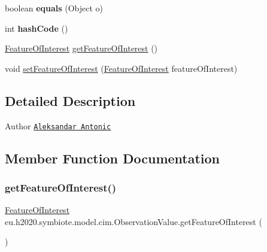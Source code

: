\begin{DoxyCompactItemize}
\mbox{\label{classeu_1_1h2020_1_1symbiote_1_1model_1_1cim_1_1ObservationValue_a40c2195ac546538a45937f7cd5fcb830}} 
boolean {\bfseries equals} (Object o)
\item 
\mbox{\label{classeu_1_1h2020_1_1symbiote_1_1model_1_1cim_1_1ObservationValue_a6a7b8635567252f78076b717274e21b7}} 
int {\bfseries hash\+Code} ()
\item 
\hyperlink{classeu_1_1h2020_1_1symbiote_1_1model_1_1cim_1_1FeatureOfInterest}{Feature\+Of\+Interest} \hyperlink{classeu_1_1h2020_1_1symbiote_1_1model_1_1cim_1_1ObservationValue_ad2672443ca00ec6220cd3a952751a44d}{get\+Feature\+Of\+Interest} ()
\item 
void \hyperlink{classeu_1_1h2020_1_1symbiote_1_1model_1_1cim_1_1ObservationValue_a957aeb12313f1e520735a398fe9cdfd0}{set\+Feature\+Of\+Interest} (\hyperlink{classeu_1_1h2020_1_1symbiote_1_1model_1_1cim_1_1FeatureOfInterest}{Feature\+Of\+Interest} feature\+Of\+Interest)
\end{DoxyCompactItemize}


\subsection{Detailed Description}
\begin{DoxyAuthor}{Author}
\href{mailto:aleksandar.antonic@fer.hr}{\tt Aleksandar Antonic} 
\end{DoxyAuthor}


\subsection{Member Function Documentation}
\mbox{\label{classeu_1_1h2020_1_1symbiote_1_1model_1_1cim_1_1ObservationValue_ad2672443ca00ec6220cd3a952751a44d}} 
\subsubsection{\texorpdfstring{get\+Feature\+Of\+Interest()}{getFeatureOfInterest()}}
{\footnotesize\ttfamily \hyperlink{classeu_1_1h2020_1_1symbiote_1_1model_1_1cim_1_1FeatureOfInterest}{Feature\+Of\+Interest} eu.\+h2020.\+symbiote.\+model.\+cim.\+Observation\+Value.\+get\+Feature\+Of\+Interest (\begin{DoxyParamCaption}{ }\end{DoxyParamCaption})}

